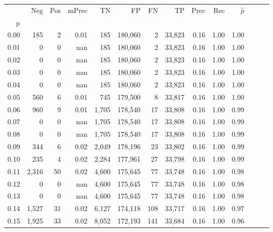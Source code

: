\begin{tabular}{rrrrrrrrrrrrrr}
\toprule
{} &     Neg &    Pos & mPrec &       TN &       FP &      FN &      TP &  Prec &   Rec & $\hat{p}$ \\
p    &         &        &       &          &          &         &         &       &       &           \\
\midrule
0.00 &     185 &      2 &  0.01 &      185 &  180,060 &       2 &  33,823 &  0.16 &  1.00 &      1.00 \\
0.01 &       0 &      0 &   nan &      185 &  180,060 &       2 &  33,823 &  0.16 &  1.00 &      1.00 \\
0.02 &       0 &      0 &   nan &      185 &  180,060 &       2 &  33,823 &  0.16 &  1.00 &      1.00 \\
0.03 &       0 &      0 &   nan &      185 &  180,060 &       2 &  33,823 &  0.16 &  1.00 &      1.00 \\
0.04 &       0 &      0 &   nan &      185 &  180,060 &       2 &  33,823 &  0.16 &  1.00 &      1.00 \\
0.05 &     560 &      6 &  0.01 &      745 &  179,500 &       8 &  33,817 &  0.16 &  1.00 &      1.00 \\
0.06 &     960 &      9 &  0.01 &    1,705 &  178,540 &      17 &  33,808 &  0.16 &  1.00 &      0.99 \\
0.07 &       0 &      0 &   nan &    1,705 &  178,540 &      17 &  33,808 &  0.16 &  1.00 &      0.99 \\
0.08 &       0 &      0 &   nan &    1,705 &  178,540 &      17 &  33,808 &  0.16 &  1.00 &      0.99 \\
0.09 &     344 &      6 &  0.02 &    2,049 &  178,196 &      23 &  33,802 &  0.16 &  1.00 &      0.99 \\
0.10 &     235 &      4 &  0.02 &    2,284 &  177,961 &      27 &  33,798 &  0.16 &  1.00 &      0.99 \\
0.11 &   2,316 &     50 &  0.02 &    4,600 &  175,645 &      77 &  33,748 &  0.16 &  1.00 &      0.98 \\
0.12 &       0 &      0 &   nan &    4,600 &  175,645 &      77 &  33,748 &  0.16 &  1.00 &      0.98 \\
0.13 &       0 &      0 &   nan &    4,600 &  175,645 &      77 &  33,748 &  0.16 &  1.00 &      0.98 \\
0.14 &   1,527 &     31 &  0.02 &    6,127 &  174,118 &     108 &  33,717 &  0.16 &  1.00 &      0.97 \\
0.15 &   1,925 &     33 &  0.02 &    8,052 &  172,193 &     141 &  33,684 &  0.16 &  1.00 &      0.96 \\

\end{tabular}
